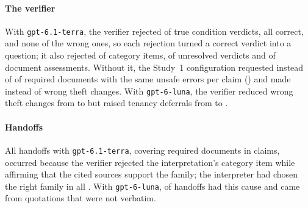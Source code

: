 \paragraph{The verifier}
With \texttt{gpt-6.1-terra}, the verifier rejected \verRejCondTrue{} of \verCheckedCondTrue{} true condition verdicts, all correct, and none of the \jaFlipped{} wrong ones, so each rejection turned a correct verdict into a question; it also rejected \verRejCategory{} of \verRuns{} category items, \verRejCondUnres{} of \verCheckedCondUnres{} unresolved verdicts and \verRejDocument{} of \verCheckedDocument{} document assessments. Without it, the Study~1 configuration requested \pct{\tenTerraCPxnRecall} instead of \pct{\tenTerraCPxRecall} of required documents with the same unsafe errors per claim (\tenTerraCPxnUnsafe) and made \thTerraCPnWrong{} instead of \thTerraCPWrong{} wrong theft changes. With \texttt{gpt-6-luna}, the verifier reduced wrong theft changes from \thLunaCPnWrong{} to \thLunaCPWrong{} but raised tenancy deferrals from \pct{\tenLunaCPxnDefer} to \pct{\tenLunaCPxDefer}.

\paragraph{Handoffs}
All \hoTerraRuns{} handoffs with \texttt{gpt-6.1-terra}, covering \hoTerraDocs{} required documents in \hoTerraVerCatClaims{} claims, occurred because the verifier rejected the interpretation's category item while affirming that the cited sources support the family; the interpreter had chosen the right family in all \hoTerraFamilyRight. With \texttt{gpt-6-luna}, \hoLunaVerCatRuns{} of \hoLunaRuns{} handoffs had this cause and \hoLunaCiteRuns{} came from quotations that were not verbatim.

